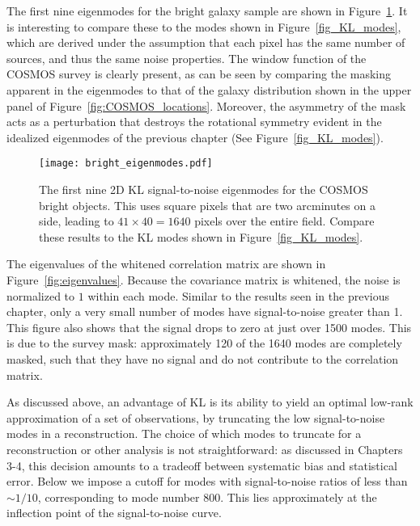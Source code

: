 The first nine eigenmodes for the bright galaxy sample
are shown in Figure~\ref{fig:eigenmodes}.
It is interesting to compare these to the modes shown in
Figure~\ref{fig_KL_modes}, which are derived under the assumption that
each pixel has the same number of sources, and thus the same noise properties.
The window function of the COSMOS survey is clearly present, as can be
seen by comparing the
masking apparent in the eigenmodes to that of the galaxy distribution
shown in the upper panel of Figure~\ref{fig:COSMOS_locations}.
Moreover, the asymmetry of the mask acts as a perturbation that destroys
the rotational symmetry evident in the idealized eigenmodes of
the previous chapter (See Figure~\ref{fig_KL_modes}).

\begin{figure*}
 \centering
 \texttt{[image: bright\_eigenmodes.pdf]}
 \caption[KL signal-to-noise eigenmodes for COSMOS data]{
   The first nine 2D KL signal-to-noise eigenmodes
   for the COSMOS bright objects.  This uses square pixels that are
   two arcminutes on a side, leading to $41 \times 40 = 1640$ pixels
   over the entire field.  Compare these results to the KL modes shown
   in Figure~\ref{fig_KL_modes}.}
   \label{fig:eigenmodes}
\end{figure*}

The eigenvalues of the whitened correlation matrix are shown in
Figure~\ref{fig:eigenvalues}.  Because the covariance matrix is
whitened, the noise is normalized to $1$ within each mode.
Similar to the results seen in the previous chapter, only a very small
number of modes have signal-to-noise greater than 1.
This figure also shows that the signal drops to zero at just over 1500
modes.  This is due to the survey mask: approximately 120 of the 1640
modes are completely masked, such that they have no signal and do not
contribute to the correlation matrix.

As discussed above, an advantage of KL is its ability to yield an optimal
low-rank approximation of a set of observations, by truncating the low
signal-to-noise modes in a reconstruction.  The choice of which modes to
truncate for a reconstruction or other analysis is not straightforward:
as discussed in Chapters 3-4, this decision amounts to a tradeoff between
systematic bias and statistical error.  Below we impose a cutoff for
modes with signal-to-noise ratios of less than $\sim 1/10$, corresponding to
mode number 800.  This lies approximately at the inflection point of the
signal-to-noise curve.

